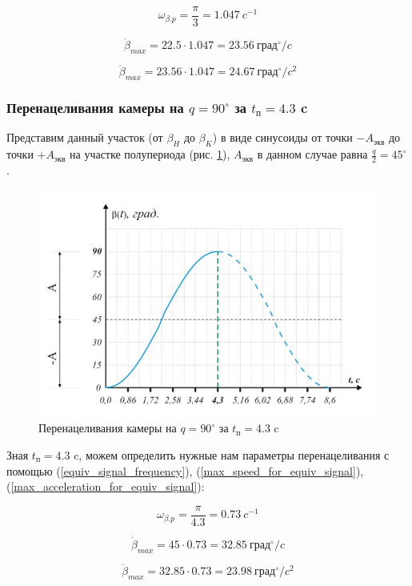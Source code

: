 $$ \omega_{\beta.p} = \frac{\pi}{3} = 1.047 ~c^{-1}                            $$

$$ \dot{\beta}_{max} = 22.5 \cdot 1.047 = 23.56 ~\text{град}^{\circ} / c       $$

$$ \ddot{\beta}_{max} = 23.56 \cdot 1.047 = 24.67 ~\text{град}^{\circ} / c^{2} $$


\subsubsection{Перенацеливания камеры на $q = 90^{\circ}$ за $t_\text{п} = 4.3$ c}

Представим данный участок (от $\beta_{H}$ до $\beta_{K}$) в виде синусоиды от точки $-A_\text{экв}$ до точки $+A_\text{экв}$ на участке полупериода (рис. \ref{retarget_90grad_4,3sec}), $A_\text{экв}$ в данном случае равна $\frac{q}{2} = 45^{\circ}$.

\begin{figure}[h!]
    \centering
    \includegraphics[keepaspectratio]{./src/pictures/retarget_equivalent_input_signals/90grad_4,3sec}
    \caption{Перенацеливания камеры на $q = 90^{\circ}$ за $t_\text{п} = 4.3$ c}
    \label{retarget_90grad_4,3sec}
\end{figure}

Зная $t_{\text{п} } = 4.3$ c, можем определить нужные нам параметры перенацеливания с помощью (\ref{equiv_signal_frequency}), (\ref{max_speed_for_equiv_signal}), (\ref{max_acceleration_for_equiv_signal}):

$$ \omega_{\beta.p} = \frac{\pi}{4.3} = 0.73 ~c^{-1}                            $$

$$ \dot{\beta}_{max} = 45 \cdot 0.73 = 32.85 ~\text{град}^{\circ} / c           $$

$$ \ddot{\beta}_{max} = 32.85 \cdot 0.73 = 23.98 ~\text{град}^{\circ} / c^{2}   $$

\endinput

